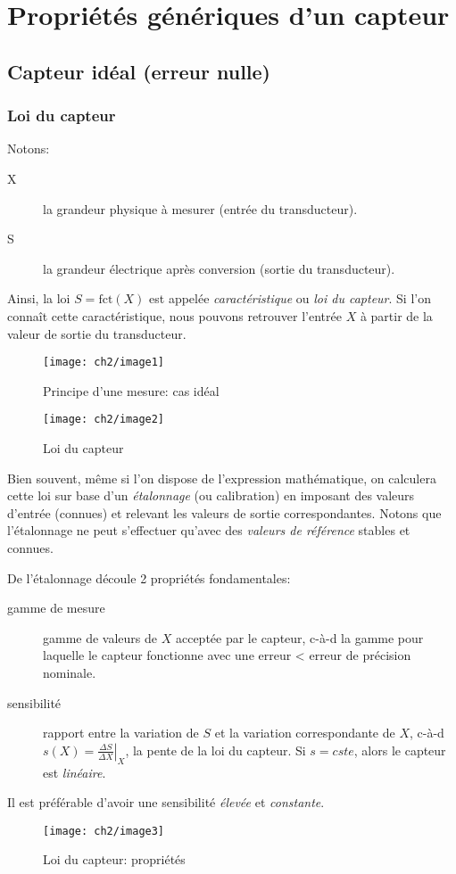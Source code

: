 \chapter{Propriétés génériques d'un capteur}
\section{Capteur idéal (erreur nulle)}
\subsection{Loi du capteur}
Notons:
\begin{description}
	\item[X] la grandeur physique à mesurer (entrée du transducteur).
	\item[S] la grandeur électrique après conversion (sortie du transducteur).
\end{description}
Ainsi, la loi \(S=\text{fct}(X)\) est appelée \emph{caractéristique} ou \emph{loi du capteur}. Si l'on connaît cette caractéristique, nous pouvons retrouver l'entrée \(X\) à partir de la valeur de sortie du transducteur. 
\begin{figure}[H] 
	\centering 
	\texttt{[image: ch2/image1]} 
	\caption{Principe d'une mesure: cas idéal}
\end{figure} 
\begin{figure}[H] 
	\centering 
	\texttt{[image: ch2/image2]} 
	\caption{Loi du capteur}
\end{figure}
Bien souvent, même si l'on dispose de l'expression mathématique, on calculera cette loi sur base d'un \emph{étalonnage} (ou calibration) en imposant des valeurs d'entrée (connues) et relevant les valeurs de sortie correspondantes. Notons que l'étalonnage ne peut s'effectuer qu'avec des \emph{valeurs de référence} stables et connues.\bigbreak

De l'étalonnage découle 2 propriétés fondamentales:
\begin{description}
	\item[gamme de mesure] gamme de valeurs de \(X\) acceptée par le capteur, c-à-d la gamme pour laquelle le capteur fonctionne avec une erreur < erreur de précision nominale.
	\item[sensibilité] rapport entre la variation de \(S\) et la variation correspondante de \(X\), c-à-d \(s(X)=\left.\frac{\Delta S}{\Delta X}\right|_X\), la pente de la loi du capteur. Si \(s=cste\), alors le capteur est \emph{linéaire}.
\end{description}
Il est préférable d'avoir une sensibilité \emph{élevée} et \emph{constante}.
\begin{figure}[H] 
	\centering 
	\texttt{[image: ch2/image3]} 
	\caption{Loi du capteur: propriétés}
\end{figure}
